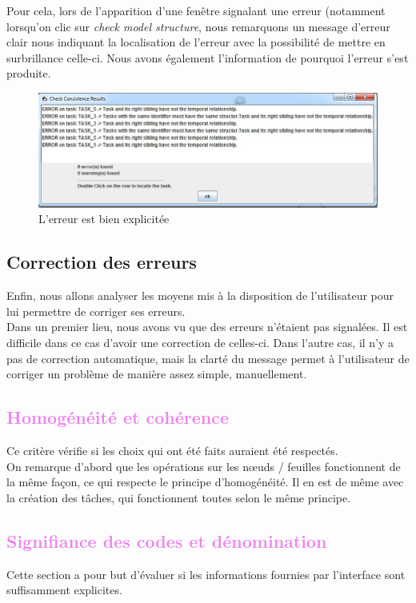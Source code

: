\documentclass[12pt, a4paper]{article}
\begin{document}
Pour cela, lors de l'apparition d'une fenêtre signalant une erreur (notamment lorsqu'on clic sur \emph{check model structure}, nous remarquons un message d'erreur clair nous indiquant la localisation de l'erreur avec la possibilité de mettre en surbrillance celle-ci. Nous avons également l'information de pourquoi l'erreur s'est produite. %

\begin{figure}[h]
\begin{center}
   \includegraphics[scale = 0.7]{erreur.jpg}
	\caption{L'erreur est bien explicitée}
	\end{center}
\end{figure}

\textcolor{NavyBlue}{\subsection{Correction des erreurs}}
Enfin, nous allons analyser les moyens mis à la disposition de l'utilisateur pour lui permettre de corriger ses erreurs.\\


Dans un premier lieu, nous avons vu que des erreurs n'étaient pas signalées. Il est difficile dans ce cas d'avoir une correction de celles-ci. Dans l'autre cas, il n'y a pas de correction automatique, mais la clarté du message permet à l'utilisateur de corriger un problème de manière assez simple, manuellement.
\textcolor{Violet}{\section{Homogénéité et cohérence}}
Ce critère vérifie si les choix qui ont été faits auraient été respectés.\\


On remarque d'abord que les opérations sur les nœuds / feuilles fonctionnent de la même façon, ce qui respecte le principe d'homogénéité. Il en est de même avec la création des tâches, qui fonctionnent toutes selon le même principe.
\newpage
\textcolor{Violet}{\section{Signifiance des codes et dénomination}}
Cette section a pour but d'évaluer si les informations fournies par l'interface sont suffisamment explicites.
\end{document}
